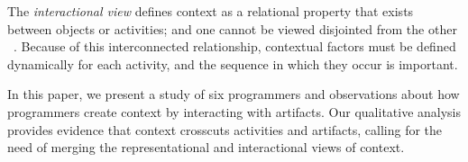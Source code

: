 The \textit{interactional view} defines context as a relational property that exists between objects or activities; and one cannot be viewed disjointed from the other ~\cite{Dourish:2004}. Because of this interconnected relationship, contextual factors must be defined dynamically for each activity, and the sequence in which they occur is important.

In this paper, we present a study of six programmers and observations about how programmers create context by interacting with artifacts. Our qualitative analysis provides evidence that context crosscuts activities and artifacts, calling for the need of merging the representational and interactional views of context.



